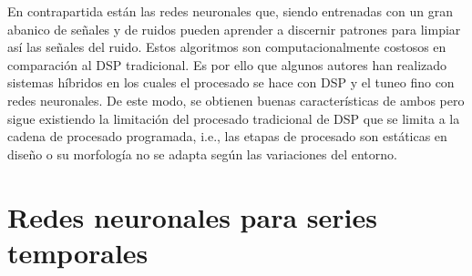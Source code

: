 En contrapartida están las redes neuronales que, siendo entrenadas con un gran abanico de señales y de ruidos pueden aprender a discernir patrones para limpiar así las señales del ruido. Estos algoritmos son computacionalmente costosos en comparación al \gls{DSP} tradicional. Es por ello que algunos autores han realizado sistemas híbridos en los cuales el procesado se hace con \gls{DSP} y el tuneo fino con redes neuronales. De este modo, se obtienen buenas características de ambos pero sigue existiendo la limitación del procesado tradicional de \gls{DSP} que se limita a la cadena de procesado programada, i.e., las etapas de procesado son estáticas en diseño o su morfología no se adapta según las variaciones del entorno.

\section{Redes neuronales para series temporales}
